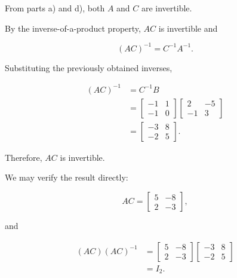 \begin{enumerate}[label=\alph*)]
    \begin{answer}
        From parts a) and d), both $A$ and $C$
        are invertible.

        By the inverse-of-a-product property,
        $AC$ is invertible and

        $$
        (AC)^{-1}=C^{-1}A^{-1}.
        $$

        Substituting the previously
        obtained inverses,

        $$
        \begin{aligned}
        (AC)^{-1}
        &=C^{-1}B\\
        &=
        \begin{bmatrix}
            -1 & 1\\
            -1 & 0
        \end{bmatrix}
        \begin{bmatrix}
            2 & -5\\
            -1 & 3
        \end{bmatrix}\\
        &=
        \boxed{
        \begin{bmatrix}
            -3 & 8\\
            -2 & 5
        \end{bmatrix}
        }.
        \end{aligned}
        $$

        Therefore, $AC$ is invertible.

        We may verify the result directly:

        $$
        AC=
        \begin{bmatrix}
            5 & -8\\
            2 & -3
        \end{bmatrix},
        $$

        and

        $$
        \begin{aligned}
        (AC)(AC)^{-1}
        &=
        \begin{bmatrix}
            5 & -8\\
            2 & -3
        \end{bmatrix}
        \begin{bmatrix}
            -3 & 8\\
            -2 & 5
        \end{bmatrix}\\
        &=I_2.
        \end{aligned}
        $$
    \end{answer}

\end{enumerate}
